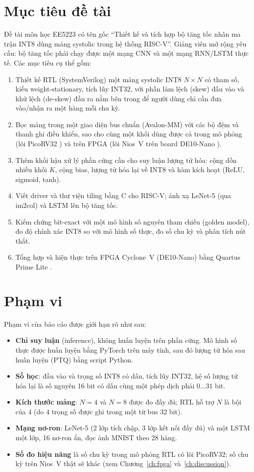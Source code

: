 \section{Mục tiêu đề tài}
Đề tài môn học EE5223 có tên gốc ``Thiết kế và tích hợp bộ tăng tốc nhân ma trận INT8 dùng mảng systolic trong hệ thống RISC-V''. Giảng viên mở rộng yêu cầu: bộ tăng tốc phải chạy được một mạng CNN và một mạng RNN/LSTM thực tế. Các mục tiêu cụ thể gồm:
\begin{enumerate}
  \item Thiết kế RTL (SystemVerilog) một mảng systolic INT8 $N\times N$ có tham số, kiểu weight-stationary, tích lũy INT32, với phần làm lệch (skew) đầu vào và khử lệch (de-skew) đầu ra nằm bên trong để người dùng chỉ cần đưa vào/nhận ra một hàng mỗi chu kỳ.
  \item Bọc mảng trong một giao diện bus chuẩn (Avalon-MM) với các bộ đệm và thanh ghi điều khiển, sao cho cùng một khối dùng được cả trong mô phỏng (lõi PicoRV32 \cite{picorv32}) và trên FPGA (lõi Nios~V \cite{niosv} trên board DE10-Nano \cite{de10nano}).
  \item Thêm khối hậu xử lý phần cứng cần cho suy luận lượng tử hóa: cộng dồn nhiều khối $K$, cộng bias, lượng tử hóa lại về INT8 và hàm kích hoạt (ReLU, sigmoid, tanh).
  \item Viết driver và thư viện tiling bằng C cho RISC-V; ánh xạ LeNet-5 \cite{lecun1998lenet} (qua im2col) và LSTM \cite{hochreiter1997lstm} lên bộ tăng tốc.
  \item Kiểm chứng bit-exact với một mô hình số nguyên tham chiếu (golden model), đo độ chính xác INT8 so với mô hình số thực, đo số chu kỳ và phân tích nút thắt.
  \item Tổng hợp và hiện thực trên FPGA Cyclone~V (DE10-Nano) bằng Quartus Prime Lite \cite{quartuslite}.
\end{enumerate}

\section{Phạm vi}
Phạm vi của báo cáo được giới hạn rõ như sau:
\begin{itemize}
  \item \textbf{Chỉ suy luận} (inference), không huấn luyện trên phần cứng. Mô hình số thực được huấn luyện bằng PyTorch trên máy tính, sau đó lượng tử hóa sau huấn luyện (PTQ) bằng script Python.
  \item \textbf{Số học}: đầu vào và trọng số INT8 có dấu, tích lũy INT32, hệ số lượng tử hóa lại là số nguyên 16 bit có dấu cùng một phép dịch phải $0\dots31$ bit.
  \item \textbf{Kích thước mảng}: $N=4$ và $N=8$ được đo đầy đủ; RTL hỗ trợ $N$ là bội của 4 (do 4 trọng số được ghi trong một từ bus 32 bit).
  \item \textbf{Mạng nơ-ron}: LeNet-5 (2 lớp tích chập, 3 lớp kết nối đầy đủ) và một LSTM một lớp, 16 nơ-ron ẩn, đọc ảnh MNIST \cite{mnist} theo 28 hàng.
  \item \textbf{Số đo hiệu năng} là số chu kỳ trong mô phỏng RTL có lõi PicoRV32; số chu kỳ trên Nios~V thật sẽ khác (xem Chương~\ref{ch:fpga} và~\ref{ch:discussion}).
\end{itemize}

